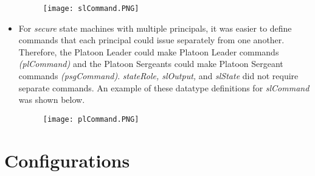 \begin{itemize}
  \begin{figure}[h]
  \centering
  \texttt{[image: slCommand.PNG]}
\end{figure}
\item For \textit{secure} state machines with multiple principals, it was easier to define
  commands that each principal could issue separately from one another.  Therefore, the Platoon
  Leader could make Platoon Leader commands \textit{(plCommand)} and the Platoon Sergeants could
  make Platoon Sergeant commands \textit{(psgCommand)}.  \textit{stateRole, slOutput,} and
  \textit{slState} did not require separate commands.  An example of these datatype definitions
  for \textit{slCommand} was shown below.
  \begin{figure}[h]
  \centering
  \texttt{[image: plCommand.PNG]}
\end{figure}
  \end{itemize}

  \chapter{Configurations}
\label{cha:configurations}

